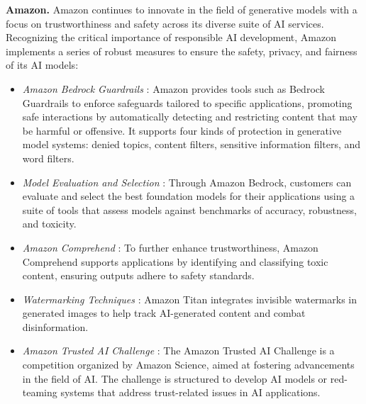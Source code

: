 \textbf{Amazon.} Amazon continues to innovate in the field of generative models with a focus on trustworthiness and safety across its diverse suite of AI services. Recognizing the critical importance of responsible AI development, Amazon implements a series of robust measures to ensure the safety, privacy, and fairness of its AI models:

\begin{itemize}[nolistsep, leftmargin=*] 
\item[] \textcolor[HTML]{222e3c}{\largedot}{\textit{Amazon Bedrock Guardrails}} \cite{amazon_bedrock_guardrails_2024}: Amazon provides tools such as Bedrock Guardrails to enforce safeguards tailored to specific applications, promoting safe interactions by automatically detecting and restricting content that may be harmful or offensive. It supports four kinds of protection in generative model systems: denied topics, content ﬁlters, sensitive information ﬁlters, and word ﬁlters. 

\item[] \textcolor[HTML]{222e3c}{\largedot}{\textit{Model Evaluation and Selection}} \cite{amazon_model_evaluation}: Through Amazon Bedrock, customers can evaluate and select the best foundation models for their applications using a suite of tools that assess models against benchmarks of accuracy, robustness, and toxicity. 

\item[] \textcolor[HTML]{222e3c}{\largedot}{\textit{Amazon Comprehend}} \cite{amazon_comprehend_safety}: To further enhance trustworthiness, Amazon Comprehend supports applications by identifying and classifying toxic content, ensuring outputs adhere to safety standards. 

\item[] \textcolor[HTML]{222e3c}{\largedot}{\textit{Watermarking Techniques}} \cite{amazon_titan_watermarking}: Amazon Titan integrates invisible watermarks in generated images to help track AI-generated content and combat disinformation. 

\item[] \textcolor[HTML]{222e3c}{\largedot}{\textit{Amazon Trusted AI Challenge}}
\cite{amazon_trusted_ai_challenge}: The Amazon Trusted AI Challenge is a competition organized by Amazon Science, aimed at fostering advancements in the field of AI. The challenge is structured to develop AI models or red-teaming systems that address trust-related issues in AI applications. 

\end{itemize}





